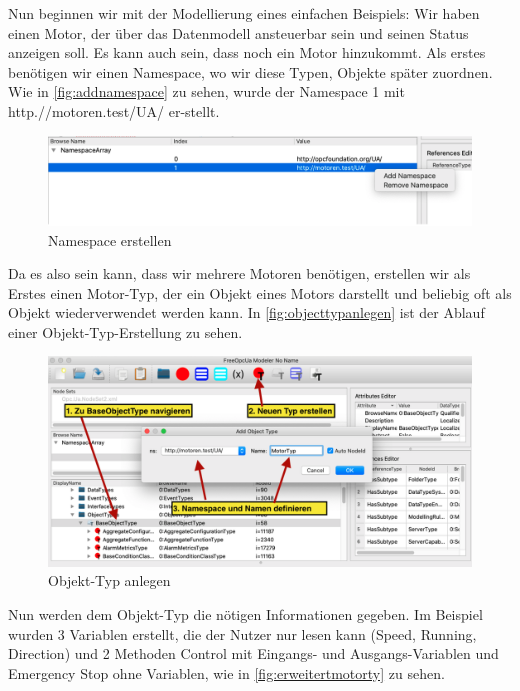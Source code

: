 Nun beginnen wir mit der Modellierung eines einfachen Beispiels:
Wir haben einen Motor, der über das Datenmodell ansteuerbar sein und seinen Status anzeigen soll. Es kann auch sein, dass noch ein Motor hinzukommt.
Als erstes benötigen wir einen Namespace, wo wir diese Typen, Objekte später zuordnen. Wie in \autoref{fig:addnamespace} zu sehen, wurde der Namespace 1 mit http.//motoren.test/UA/ er-stellt.
\begin{figure}[H]
	\centering
	\includegraphics[width=1\linewidth]{abb/AddNamespace}
	\caption{Namespace erstellen}
	\label{fig:addnamespace}
\end{figure}
Da es also sein kann, dass wir mehrere Motoren benötigen, erstellen wir als Erstes einen Motor-Typ, der ein Objekt eines Motors darstellt und beliebig oft als Objekt wiederverwendet werden kann. In \autoref{fig:objecttypanlegen} ist der Ablauf einer Objekt-Typ-Erstellung zu sehen.
\begin{figure}[H]
	\centering
	\includegraphics[width=1\linewidth]{abb/ObjectTypAnlegen}
	\caption{Objekt-Typ anlegen}
	\label{fig:objecttypanlegen}
\end{figure}
Nun werden dem Objekt-Typ die nötigen Informationen gegeben.
Im Beispiel wurden 3 Variablen erstellt, die der Nutzer nur lesen kann (Speed, Running, Direction) und 2 Methoden Control mit Eingangs- und Ausgangs-Variablen und Emergency Stop ohne Variablen, wie in \autoref{fig:erweitertmotorty} zu sehen.
